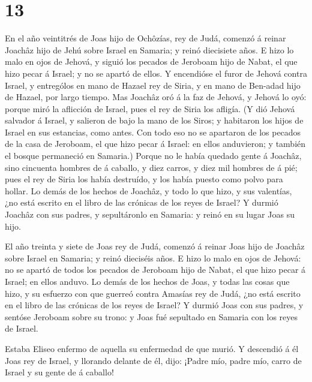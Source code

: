 \hypertarget{section-12}{%
\section{13}\label{section-12}}

 En el año veintitrés de Joas hijo de Ochôzías, rey de Judá,
comenzó á reinar Joachâz hijo de Jehú sobre Israel en Samaria; y reinó
diecisiete años.  E hizo lo malo en ojos de Jehová, y siguió
los pecados de Jeroboam hijo de Nabat, el que hizo pecar á Israel; y no
se apartó de ellos.  Y encendióse el furor de Jehová contra
Israel, y entrególos en mano de Hazael rey de Siria, y en mano de
Ben-adad hijo de Hazael, por largo tiempo.  Mas Joachâz oró
á la faz de Jehová, y Jehová lo oyó: porque miró la aflicción de Israel,
pues el rey de Siria los afligía.  (Y dió Jehová salvador á
Israel, y salieron de bajo la mano de los Siros; y habitaron los hijos
de Israel en sus estancias, como antes.  Con todo eso no se
apartaron de los pecados de la casa de Jeroboam, el que hizo pecar á
Israel: en ellos anduvieron; y también el bosque permaneció en Samaria.)
 Porque no le había quedado gente á Joachâz, sino cincuenta
hombres de á caballo, y diez carros, y diez mil hombres de á pié; pues
el rey de Siria los había destruído, y los había puesto como polvo para
hollar.  Lo demás de los hechos de Joachâz, y todo lo que
hizo, y sus valentías, ¿no está escrito en el libro de las crónicas de
los reyes de Israel?  Y durmió Joachâz con sus padres, y
sepultáronlo en Samaria: y reinó en su lugar Joas su hijo.

 El año treinta y siete de Joas rey de Judá, comenzó á
reinar Joas hijo de Joachâz sobre Israel en Samaria; y reinó dieciséis
años.  E hizo lo malo en ojos de Jehová: no se apartó de
todos los pecados de Jeroboam hijo de Nabat, el que hizo pecar á Israel;
en ellos anduvo.  Lo demás de los hechos de Joas, y todas
las cosas que hizo, y su esfuerzo con que guerreó contra Amasías rey de
Judá, ¿no está escrito en el libro de las crónicas de los reyes de
Israel?  Y durmió Joas con sus padres, y sentóse Jeroboam
sobre su trono: y Joas fué sepultado en Samaria con los reyes de Israel.

 Estaba Eliseo enfermo de aquella su enfermedad de que
murió. Y descendió á él Joas rey de Israel, y llorando delante de él,
dijo: ¡Padre mío, padre mío, carro de Israel y su gente de á caballo!

